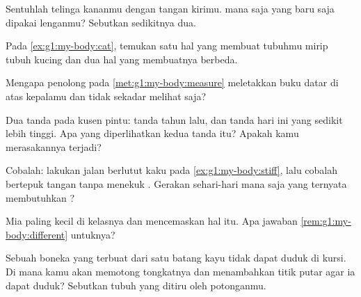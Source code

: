 \begin{exercise}[$\star$]\label{exo:g1:my-body:4}
Sentuhlah telinga kananmu dengan tangan kirimu.  mana saja yang
baru saja dipakai lenganmu? Sebutkan sedikitnya dua.
\end{exercise}

\begin{exercise}[$\star$]\label{exo:g1:my-body:5}
Pada \cref{ex:g1:my-body:cat}, temukan satu hal yang membuat tubuhmu
mirip tubuh kucing dan dua hal yang membuatnya berbeda.
\end{exercise}

\begin{exercise}[$\star$]\label{exo:g1:my-body:6}
Mengapa penolong pada \cref{met:g1:my-body:measure} meletakkan buku
datar di atas kepalamu dan tidak sekadar melihat saja?
\end{exercise}

\begin{exercise}[$\star$]\label{exo:g1:my-body:7}
Dua tanda pada kusen pintu: tanda tahun lalu, dan tanda hari ini yang
sedikit lebih tinggi. Apa yang diperlihatkan kedua tanda itu? Apakah
kamu merasakannya terjadi?
\end{exercise}

\begin{exercise}[$\star$]\label{exo:g1:my-body:8}
Cobalah: lakukan jalan berlutut kaku pada \cref{ex:g1:my-body:stiff},
lalu cobalah bertepuk tangan tanpa menekuk . Gerakan sehari-hari
mana saja yang ternyata membutuhkan ?
\end{exercise}

\begin{exercise}[$\star\star$]\label{exo:g1:my-body:9}
Mia paling kecil di kelasnya dan mencemaskan hal itu. Apa jawaban
\cref{rem:g1:my-body:different} untuknya?
\end{exercise}

\begin{exercise}[$\star\star$]\label{exo:g1:my-body:10}
Sebuah boneka yang terbuat dari satu batang kayu tidak dapat duduk di
kursi. Di mana kamu akan memotong tongkatnya dan menambahkan titik
putar agar ia dapat duduk? Sebutkan  tubuh yang ditiru oleh
potonganmu.
\end{exercise}
